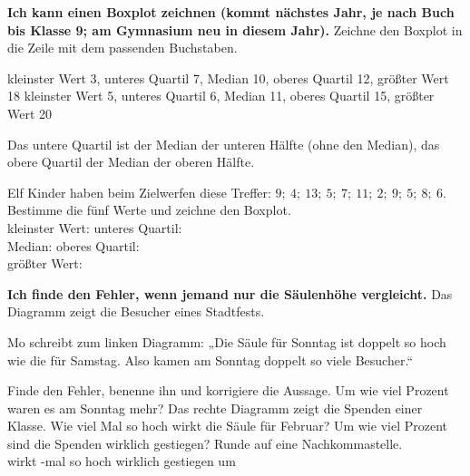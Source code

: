\begin{aufgabe}{\textbf{Ich kann einen Boxplot zeichnen (kommt nächstes Jahr, je nach Buch bis Klasse 9; am Gymnasium neu in diesem Jahr).} Zeichne den Boxplot in die Zeile mit dem passenden Buchstaben.}
\begin{teile}
\teil kleinster Wert 3, unteres Quartil 7, Median 10, oberes Quartil 12, größter Wert 18
\teil kleinster Wert 5, unteres Quartil 6, Median 11, oberes Quartil 15, größter Wert 20
\end{teile}
Das untere Quartil ist der Median der unteren Hälfte (ohne den Median), das obere Quartil der Median der oberen Hälfte.
\begin{teile}
\teil Elf Kinder haben beim Zielwerfen diese Treffer: $9;\ 4;\ 13;\ 5;\ 7;\ 11;\ 2;\ 9;\ 5;\ 8;\ 6$. Bestimme die fünf Werte und zeichne den Boxplot.\\ kleinster Wert: \leerfeld \quad unteres Quartil: \leerfeld\\ Median: \leerfeld \quad oberes Quartil: \leerfeld\\ größter Wert: \leerfeld
\end{teile}

\begin{boxplots}[xmin=0,xmax=20,xstep=1,xlabel=Wert]
\end{boxplots}
\end{aufgabe}

\begin{aufgabe}{\textbf{Ich finde den Fehler, wenn jemand nur die Säulenhöhe vergleicht.} Das Diagramm zeigt die Besucher eines Stadtfests.}

\noindent\begin{minipage}[t]{0.48\linewidth}
\end{minipage}\hfill
\begin{minipage}[t]{0.48\linewidth}
\end{minipage}

\noindent Mo schreibt zum linken Diagramm: „Die Säule für Sonntag ist doppelt so hoch wie die für Samstag. Also kamen am Sonntag doppelt so viele Besucher.“
\begin{teile}
\teil Finde den Fehler, benenne ihn und korrigiere die Aussage. Um wie viel Prozent waren es am Sonntag mehr? \leerfeld[\%]
\teil Das rechte Diagramm zeigt die Spenden einer Klasse. Wie viel Mal so hoch wirkt die Säule für Februar? Um wie viel Prozent sind die Spenden wirklich gestiegen? Runde auf eine Nachkommastelle.\\ wirkt \leerfeld-mal so hoch \quad wirklich gestiegen um \leerfeld[\%]
\end{teile}
\end{aufgabe}

